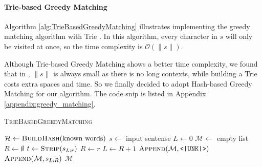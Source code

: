 \paragraph{Trie-based Greedy Matching} Algorithm \ref{alg:TrieBasedGreedyMatching} illustrates implementing the greedy matching algorithm with Trie \cite{de1959file}. In this algorithm, every character in $s$ will only be visited at once, so the time complexity is $\mathcal{O}(\|s\|)$.

Although Trie-based Greedy Matching shows a better time complexity, we found that in \cite{Pang+Lee:05a}, $\|s\|$ is always small as there is no long contexts, while building a Trie costs extra spaces and time. So we finally decided to adopt Hash-based Greedy Matching for our algorithm. The code snip is listed in Appendix \ref{appendix:greedy_matching}.

\begin{algorithm}
	\caption{\textsc{TrieBasedGreedyMatching}}
    \label{alg:HashBasedGreedyMatching}
	\begin{algorithmic}
        \State $\mathcal{H} \leftarrow \textsc{BuildHash}(\text{known words})$
        \State $s\leftarrow$ input sentense
        \State $L \leftarrow 0$
        \State $\mathcal{M} \leftarrow$ empty list
            \State $R \leftarrow \emptyset$
            \For{$r \in [L, \textsc{Length}(s))$}
                \State $t\leftarrow \textsc{Strip}(s_{L:r})$
                    \State $R\leftarrow r$
                \EndIf
            \EndFor
            \State $L\leftarrow R + 1$
            \State $\textsc{Append}(\mathcal{M}, \texttt{<|UNK|>})$
            \Else
            \State $\textsc{Append}(\mathcal{M}, s_{L:R})$
            \EndIf
        \EndWhile
        \State \Return $\mathcal{M}$
	\end{algorithmic} 
\end{algorithm}

